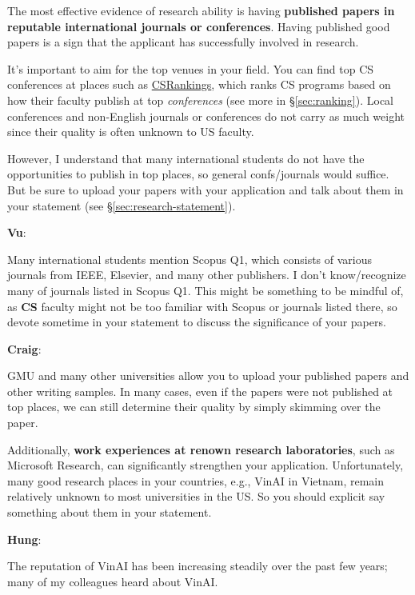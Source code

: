 \documentclass[11pt]{article}
\newenvironment{commentbox}[1][]{
\small
    \begin{cbox}
    \textbf{#1}: 
 }{
   \end{cbox}
}
\begin{document}
The most effective evidence of research ability is having \textbf{published papers in reputable international journals or conferences}.
Having published good papers is a sign that the applicant has successfully involved in research.

It's important to aim for the top venues in your field. You can
find top CS conferences at places such as \href{https://csrankings.org}{CSRankings}, which ranks CS programs based on how their faculty publish at top \emph{conferences} (see more in \S\ref{sec:ranking}). Local conferences and non-English journals or conferences do
not carry as much weight since their quality is often unknown to US faculty.


However, I understand that many international students do not have the opportunities to publish in top places, so general confs/journals would suffice.  But be sure to upload your papers with your application and talk about them in your statement (see \S\ref{sec:research-statement}).

\begin{commentbox}[Vu]
Many international students mention Scopus Q1, which consists of various journals from IEEE, Elsevier, and many other publishers.  I don't know/recognize many of journals listed in Scopus Q1. This might be something to be mindful of, as \textbf{CS} faculty might not be too familiar with Scopus or journals listed there, so devote sometime in your statement to discuss the significance of your papers.
\end{commentbox}

\begin{commentbox}[Craig]
GMU and many other universities allow you to upload your published papers and other writing samples. In many cases, even if the papers were not published at top places, we can still determine their quality by simply skimming over the paper.  
\end{commentbox}

Additionally, \textbf{work experiences at renown research laboratories}, such as Microsoft Research, can significantly strengthen your
application.  Unfortunately, many good research places in your countries, e.g., VinAI in Vietnam, remain relatively unknown to most universities in the US. So you should explicit say something about them in your statement.



\begin{commentbox}[Hung]
The reputation of VinAI has been increasing steadily over the past few years; many of my colleagues heard about VinAI.
\end{commentbox}
\end{document}
